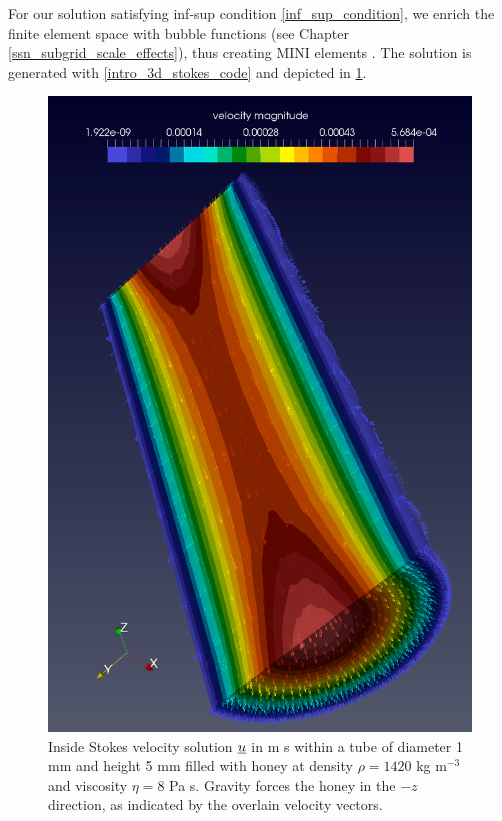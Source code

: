 For our solution satisfying inf-sup condition \cref{inf_sup_condition}, we enrich the finite element space with bubble functions (see Chapter \cref{ssn_subgrid_scale_effects}), thus creating MINI elements \citep{arnold_1984}.  The solution is generated with \cref{intro_3d_stokes_code} and depicted in \cref{intro_3d_stokes_image}.


\begin{figure}
  \centering
    \includegraphics[width=0.8\linewidth]{images/fenics_intro/3Dstokes_new.png}
  \caption[Three-dimensional-no-slip Stokes example]{Inside Stokes velocity solution $\underline{u}$ in m s within a tube of diameter 1 mm and height 5 mm filled with honey at density $\rho = 1420$ kg m$^{-3}$ and viscosity $\eta = 8$ Pa s.  Gravity forces the honey in the $-z$ direction, as indicated by the overlain velocity vectors.}
  \label{intro_3d_stokes_image}
\end{figure}
